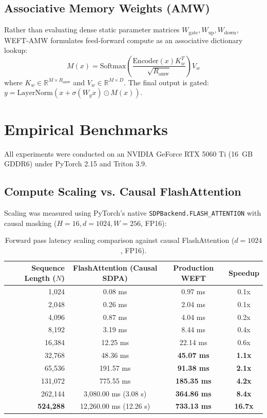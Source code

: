 \documentclass[11pt,a4paper]{article}
\begin{document}
\subsection{Associative Memory Weights (AMW)}
Rather than evaluating dense static parameter matrices $W_{\text{gate}}, W_{\text{up}}, W_{\text{down}}$, WEFT-AMW formulates feed-forward compute as an associative dictionary lookup:
\begin{equation}
M(x) = \text{Softmax}\left(\frac{\text{Encoder}(x) K_w^T}{\sqrt{R_{\text{amw}}}}\right) V_w
\end{equation}
where $K_w \in \mathbb{R}^{M \times R_{\text{amw}}}$ and $V_w \in \mathbb{R}^{M \times D}$. The final output is gated: $y = \text{LayerNorm}(x + \sigma(W_g x) \odot M(x))$.

\section{Empirical Benchmarks}
All experiments were conducted on an NVIDIA GeForce RTX 5060 Ti (16~GB GDDR6) under PyTorch 2.15 and Triton 3.9.

\subsection{Compute Scaling vs. Causal FlashAttention}
Scaling was measured using PyTorch's native \texttt{SDPBackend.FLASH\_ATTENTION} with causal masking ($H=16, d=1024, W=256$, FP16):
\begin{table}[h]
\centering
\begin{tabular}{rccc}
\toprule
\textbf{Sequence Length ($N$)} & \textbf{FlashAttention (Causal SDPA)} & \textbf{Production WEFT} & \textbf{Speedup} \\
\midrule
1,024   & 0.08 ms   & 0.97 ms  & 0.1x \\
2,048   & 0.26 ms   & 2.04 ms  & 0.1x \\
4,096   & 0.87 ms   & 4.04 ms  & 0.2x \\
8,192   & 3.19 ms   & 8.44 ms  & 0.4x \\
16,384  & 12.25 ms  & 22.14 ms & 0.6x \\
32,768  & 48.36 ms  & \textbf{45.07 ms} & \textbf{1.1x} \\
65,536  & 191.57 ms & \textbf{91.38 ms} & \textbf{2.1x} \\
131,072 & 775.55 ms & \textbf{185.35 ms} & \textbf{4.2x} \\
262,144 & 3,080.00 ms (3.08 s) & \textbf{364.86 ms} & \textbf{8.4x} \\
\textbf{524,288} & 12,260.00 ms (12.26 s) & \textbf{733.13 ms} & \textbf{16.7x} \\
\bottomrule
\end{tabular}
\caption{Forward pass latency scaling comparison against causal FlashAttention ($d=1024$, FP16).}
\end{table}
\end{document}
